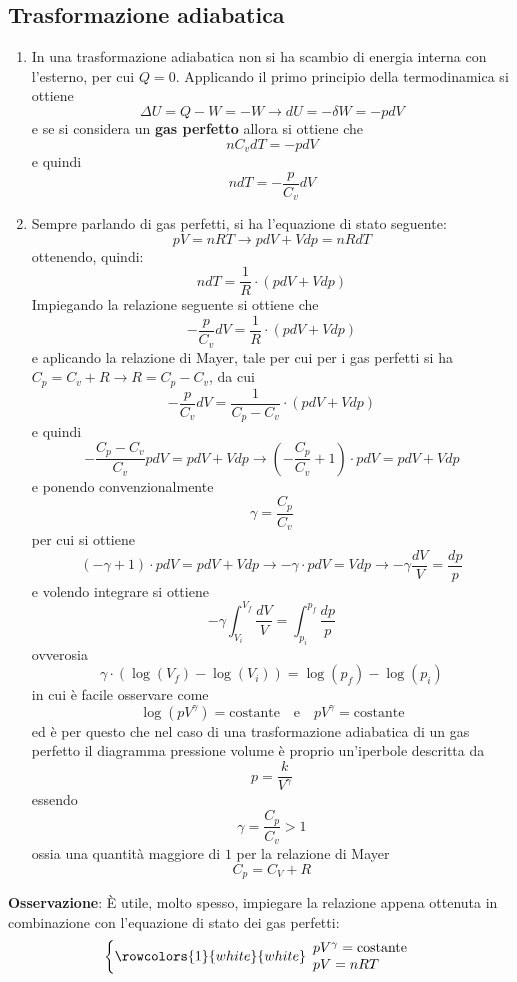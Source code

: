 \documentclass[a4paper]{extarticle}
\begin{document}
\subsection{Trasformazione adiabatica}
\begin{enumerate}
  \item In una trasformazione adiabatica non si ha scambio di energia interna con l'esterno, per cui $Q=0$. Applicando il primo principio della termodinamica si ottiene
  \[\Delta U = Q - W = - W \longrightarrow dU = -\delta W = - p dV\]
  e se si considera un \textbf{gas perfetto} allora si ottiene che
  \[n C_v dT = - p dV\]
  e quindi
  \[\boxed{n dT = - \frac{p}{C_v} dV}\]

  \item Sempre parlando di gas perfetti, si ha l'equazione di stato seguente:
  \[pV = nRT \longrightarrow p dV + V dp = n R dT\]
  ottenendo, quindi:
  \[\boxed{n dT = \frac{1}{R} \cdot \left(p dV + V dp \right)}\]
  Impiegando la relazione seguente si ottiene che
  \[-\frac{p}{C_v} dV = \frac{1}{R} \cdot \left(p dV + V dp \right)\]
  e aplicando la relazione di Mayer, tale per cui per i gas perfetti si ha $C_p = C_v + R \longrightarrow R = C_p - C_v$, da cui
  \[-\frac{p}{C_v} dV = \frac{1}{C_p - C_v} \cdot \left(p dV + V dp \right)\]
  e quindi
  \[-\frac{C_p - C_v}{C_v} p dV = p dV + V dp \longrightarrow \left(- \frac{C_p}{C_v} + 1\right) \cdot p dV = p dV + V dp\]
  e ponendo convenzionalmente
  \[\boxed{\gamma = \frac{C_p}{C_v}}\]
  per cui si ottiene
  \[\left(- \gamma + 1\right) \cdot p dV = p dV + V dp \longrightarrow -\gamma \cdot p dV = V dp \longrightarrow -\gamma \frac{dV}{V} = \frac{dp}{p}\]
  e volendo integrare si ottiene
  \[- \gamma \int_{V_i}^{V_f} \frac{dV}{V} = \int_{p_i}^{p_f} \frac{dp}{p}\]
  ovverosia
  \[\gamma \cdot \left(\log(V_f) - \log(V_i)\right) = \log(p_f) - \log(p_i)\]
  in cui è facile osservare come
  \[\boxed{\log(p V^{\gamma}) = \text{costante}} \hspace{1em} \text{e} \hspace{1em} \boxed{pV^\gamma = \text{costante}}\]
  ed è per questo che nel caso di una trasformazione adiabatica di un gas perfetto il diagramma pressione volume è proprio un'iperbole descritta da
  \[\boxed{p = \frac{k}{V^\gamma}}\]
  essendo
  \[\boxed{\gamma = \frac{C_p}{C_v} > 1}\]
  ossia una quantità maggiore di $1$ per la relazione di Mayer
  \[C_p = C_V + R\]
\end{enumerate}

\vspace{1em}
\noindent
\textbf{Osservazione}: È utile, molto spesso, impiegare la relazione appena ottenuta in combinazione con l'equazione di stato dei gas perfetti:
\[
  \left\{
  \rowcolors{1}{white}{white}
  \begin{array}{l}
      pV^\gamma = \text{costante}\\
      pV = n R T
  \end{array}
  \right.
\]
\end{document}
